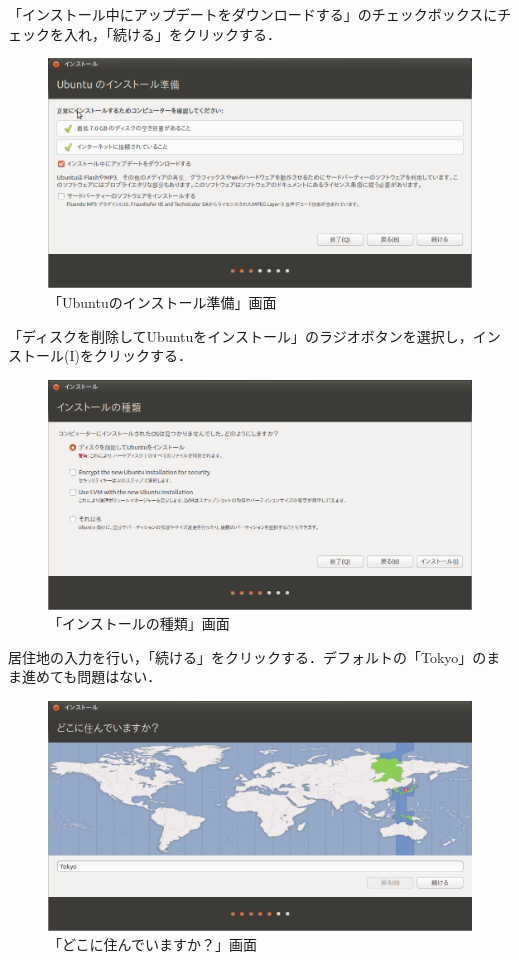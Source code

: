 「インストール中にアップデートをダウンロードする」のチェックボックスにチェックを入れ，「続ける」をクリックする．
	
\begin{figure}[H]
\centering
\includegraphics[width=13cm]{ubuntuinstall02.PNG}
\caption{「Ubuntuのインストール準備」画面}\label{ubuntuinstall02}
\end{figure}
	
「ディスクを削除してUbuntuをインストール」のラジオボタンを選択し，インストール(I)をクリックする．
	
\begin{figure}[H]
\centering
\includegraphics[width=13cm]{ubuntuinstall03.PNG}
\caption{「インストールの種類」画面}\label{ubuntuinstall03}
\end{figure}
	
居住地の入力を行い，「続ける」をクリックする．デフォルトの「Tokyo」のまま進めても問題はない．
	
\begin{figure}[H]
\centering
\includegraphics[width=13cm]{ubuntuinstall04.PNG}
\caption{「どこに住んでいますか？」画面}\label{ubuntuinstall04}
\end{figure}

